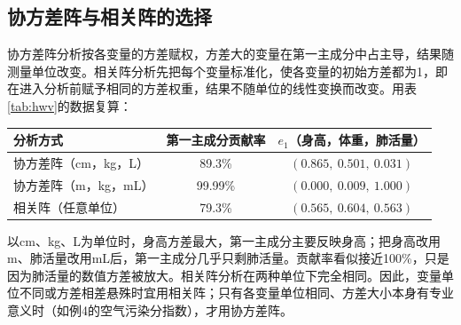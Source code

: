 \subsection{协方差阵与相关阵的选择}
协方差阵分析按各变量的方差赋权，方差大的变量在第一主成分中占主导，结果随测量单位改变。相关阵分析先把每个变量标准化，使各变量的初始方差都为1，即在进入分析前赋予相同的方差权重，结果不随单位的线性变换而改变。用表\ref{tab:hwv}的数据复算：
\begin{center}\small\begin{tabular}{lcc}\toprule
{\bfseries 分析方式}&{\bfseries 第一主成分贡献率}&{\bfseries $e_1$（身高，体重，肺活量）}\\\midrule
协方差阵（cm，kg，L）&89.3\%&$(0.865,\ 0.501,\ 0.031)$\\
协方差阵（m，kg，mL）&99.99\%&$(0.000,\ 0.009,\ 1.000)$\\
相关阵（任意单位）&79.3\%&$(0.565,\ 0.604,\ 0.563)$\\\bottomrule
\end{tabular}\end{center}
以cm、kg、L为单位时，身高方差最大，第一主成分主要反映身高；把身高改用m、肺活量改用mL后，第一主成分几乎只剩肺活量。贡献率看似接近100\%，只是因为肺活量的数值方差被放大。相关阵分析在两种单位下完全相同。因此，变量单位不同或方差相差悬殊时宜用相关阵；只有各变量单位相同、方差大小本身有专业意义时（如例4的空气污染分指数），才用协方差阵。
